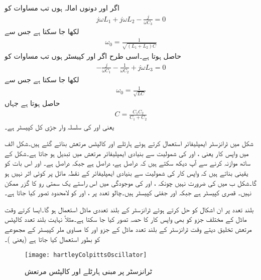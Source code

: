 اگر  اور  دونوں امالہ ہوں تب مساوات  کو
\begin{align*}
j \omega L_1 +j \omega L_2 -\frac{j}{\omega C_3}=0
\end{align*}
لکھا جا سکتا ہے جس سے
\begin{align}\label{مساوات_مرتعش_ہارٹلے_قدرتی_تعدد}
\omega_0=\frac{1}{\sqrt{\left(L_1+L_2 \right) C}}
\end{align}
حاصل ہوتا ہے۔اسی طرح اگر  اور  کپیسٹر ہوں تب مساوات  کو
\begin{align*}
-\frac{j}{\omega C_1}-\frac{1}{\omega C_2}+j \omega L_3=0
\end{align*}
لکھا جا سکتا ہے جس سے
\begin{align}\label{مساوات_مرتعش_کالپٹس_قدرتی_تعدد}
\omega_0=\frac{1}{\sqrt{L C}}
\end{align}
حاصل ہوتا ہے جہاں
\begin{align}
C=\frac{C_1 C_2}{C_1 + C_2}
\end{align}
یعنی  اور  کی سلسلہ وار جڑی کل کپیسٹر ہے۔

شکل  میں ٹرانزسٹر ایمپلیفائر استعمال کرتے ہوئے ہارٹلے اور کالپٹس مرتعش بنائے گئے ہیں۔شکل  الف میں واپس کار یعنی ،  اور  کی شمولیت سے بنیادی ایمپلیفائر مرتعش میں تبدیل ہو جاتا ہے۔شکل  کے ساتھ موازنہ کرنے سے آپ دیکھ سکتے ہیں کہ  دراصل  ہے،  دراصل  ہے جبکہ  دراصل  ہے۔ اور  اس بات کو یقینی بناتے ہیں کہ  واپس کار کی شمولیت سے بنیادی ایمپلیفائر کے نقطہ مائل پر کوئی اثر نہیں ہو گا۔شکل  ب میں  کی ضرورت نہیں چونکہ ،  اور  کی موجودگی میں اس راستے یک سمتی رو کا گزر ممکن نہیں۔ قصری کپیسٹر ہے جبکہ  اور  جفتی کپیسٹر ہیں۔چالو تعدد پر ،  اور  کو لامحدود تصور کیا جاتا ہے۔

بلند تعدد پر ان اشکال کو حل کرتے ہوئے ٹرانزسٹر کے بلند تعددی ماڈل استعمال ہو گا۔ایسا کرتے وقت ماڈل کے مختلف جزو کو بھی واپس کار کا حصہ تصور کیا جا سکتا ہے۔مثلاً نہایت بلند تعدد کالپٹس مرتعش تخلیق دیتے وقت ٹرانزسٹر کے بلند تعدد ماڈل کے جزو  اور  کا مساوی ملر کپیسٹر  کے مجموعے کو بطور  استعمال کیا جاتا ہے (یعنی )۔
%
\begin{figure}
\centering
\texttt{[image: hartleyColpittsOscillator]}
\caption{ٹرانزسٹر پر مبنی ہارٹلے اور کالپٹس مرتعش}
\label{شکل_مرتعش_ہارٹلے_کالپٹس}
\end{figure}

